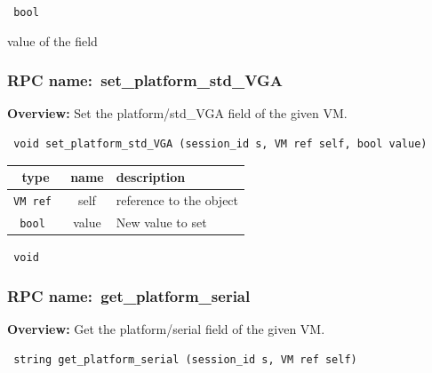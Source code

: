 \vspace{0.3cm}

{\tt 
bool
}


value of the field
\vspace{0.3cm}
\vspace{0.3cm}
\vspace{0.3cm}
\subsubsection{RPC name:~set\_platform\_std\_VGA}

{\bf Overview:} 
Set the platform/std\_VGA field of the given VM.

\begin{verbatim} void set_platform_std_VGA (session_id s, VM ref self, bool value)\end{verbatim}



 
\vspace{0.3cm}
\begin{tabular}{|c|c|p{7cm}|}
 \hline
{\bf type} & {\bf name} & {\bf description} \\ \hline
{\tt VM ref } & self & reference to the object \\ \hline 

{\tt bool } & value & New value to set \\ \hline 

\end{tabular}

\vspace{0.3cm}

{\tt 
void
}



\vspace{0.3cm}
\vspace{0.3cm}
\vspace{0.3cm}
\subsubsection{RPC name:~get\_platform\_serial}

{\bf Overview:} 
Get the platform/serial field of the given VM.

\begin{verbatim} string get_platform_serial (session_id s, VM ref self)\end{verbatim}


